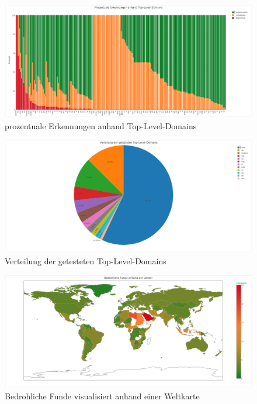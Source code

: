 \begin{figure}[H]
  \centering
  \includegraphics[width=15cm]{images/stats/tldprozentual}
  \caption{prozentuale Erkennungen anhand Top-Level-Domains}
  \label{fig:tldprozentual}
\end{figure}


\begin{figure}[H]
  \centering
  \includegraphics[width=15cm]{images/stats/tldverteilung}
  \caption{Verteilung der getesteten Top-Level-Domains}
  \label{fig:tldverteilung}
\end{figure}


\begin{figure}[H]
  \centering
  \includegraphics[width=15cm]{images/stats/weltkarte}
  \caption{Bedrohliche Funde visualisiert anhand einer Weltkarte}
  \label{fig:weltkarte}
\end{figure}



